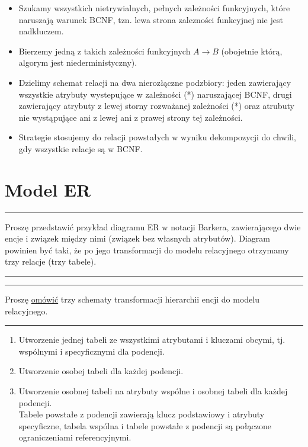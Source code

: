 \documentclass[a5paper,6pt]{article}
\newcommand{\horrule}[1]{\rule{\linewidth}{#1}}
\begin{document}
    \begin{itemize}
        \item Szukamy wszystkich nietrywialnych, pełnych zależności funkcyjnych,
              które naruszają warunek BCNF, tzn. lewa strona zalezności
              funkcyjnej nie jest nadkluczem.
        \item Bierzemy jedną z takich zależności funkcyjnych $A \rightarrow B$
              (obojetnie którą, algorym jest niederministyczny).
        \item Dzielimy schemat relacji na dwa nierozłączne podzbiory:
              jeden zawierający wszystkie atrybuty wystepujące w zależności (*)
              naruszającej BCNF,
              drugi zawierający atrybuty z lewej storny rozważanej zależności
              (*) oraz atrubuty nie wystąpujące ani z lewej ani z prawej strony
              tej zależności.
        \item Strategie stosujemy do relacji powstałych w wyniku dekompozycji
              do chwili, gdy wszystkie relacje są w BCNF.
    \end{itemize}


    \section{Model ER} %
    \label{sec:model_er}

    \horrule{0.5pt}
    Proszę przedstawić przykład diagramu ER w notacji Barkera, zawierającego
    dwie encje i związek między nimi (związek bez własnych atrybutów). Diagram
    powinien być taki, że po jego transformacji do modelu relacyjnego otrzymamy
    trzy relacje (trzy tabele).\\
    \horrule{0.5pt}

    \horrule{0.5pt}
    Proszę \underline{omówić} trzy schematy transformacji hierarchii encji do modelu relacyjnego.\\
    \horrule{0.5pt}

    \begin{enumerate}
        \item Utworzenie jednej tabeli ze wszystkimi atrybutami i kluczami
              obcymi, tj. wspólnymi i specyficznymi dla podencji.
        \item Utworzenie osobej tabeli dla każdej podencji.
        \item Utworzenie osobnej tabeli na atrybuty wspólne i osobnej tabeli
              dla każdej podencji.\\
              Tabele powstałe z podencji zawierają klucz podstawiowy i atrybuty
              specyficzne, tabela wspólna i tabele powstałe z podencji są
              połączone ograniczeniami referencyjnymi.
    \end{enumerate}
\end{document}
